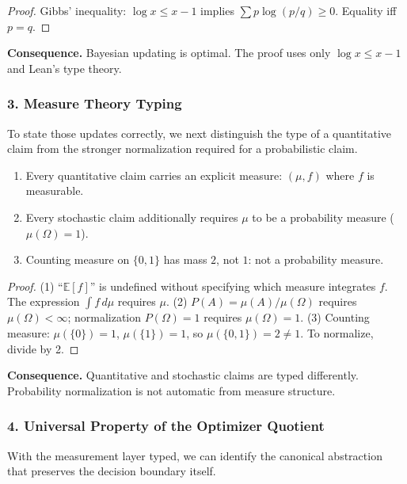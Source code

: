 \begin{proof}
Gibbs' inequality: $\log x \leq x - 1$ implies $\sum p \log(p/q) \geq 0$. Equality iff $p = q$.
\end{proof}

\noindent\textbf{Consequence.} Bayesian updating is optimal. The proof uses only $\log x \leq x - 1$ and Lean's type theory.

\subsubsection{3. Measure Theory Typing}

To state those updates correctly, we next distinguish the type of a quantitative claim from the stronger normalization required for a probabilistic claim.

\begin{theorem}\label{thm:measure-prerequisite}
\begin{enumerate}
\item Every quantitative claim carries an explicit measure: $(\mu, f)$ where $f$ is measurable.
\item Every stochastic claim additionally requires $\mu$ to be a probability measure ($\mu(\Omega) = 1$).
\item Counting measure on $\{0,1\}$ has mass $2$, not $1$: not a probability measure.
\end{enumerate}
\end{theorem}

\begin{proof}
(1) ``$\mathbb{E}[f]$'' is undefined without specifying which measure integrates $f$. The expression $\int f\,d\mu$ requires $\mu$.
(2) $P(A) = \mu(A)/\mu(\Omega)$ requires $\mu(\Omega) < \infty$; normalization $P(\Omega) = 1$ requires $\mu(\Omega) = 1$.
(3) Counting measure: $\mu(\{0\}) = 1$, $\mu(\{1\}) = 1$, so $\mu(\{0,1\}) = 2 \neq 1$. To normalize, divide by 2.
\end{proof}

\noindent\textbf{Consequence.} Quantitative and stochastic claims are typed differently. Probability normalization is not automatic from measure structure.

\subsubsection{4. Universal Property of the Optimizer Quotient}

With the measurement layer typed, we can identify the canonical abstraction that preserves the decision boundary itself.

